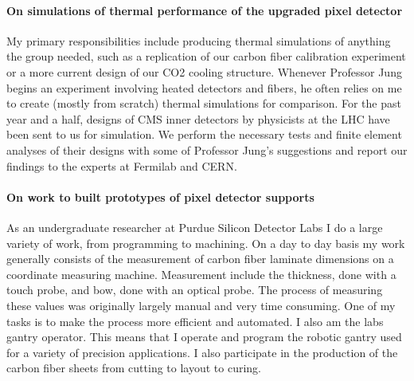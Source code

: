\documentclass[
  paper=a4,
  fontsize=12pt,
  DIV=16,
  headheight=52pt,
  footheight=45pt,
  headinclude,
  parskip=full,
]{scrartcl}
\begin{document}
\paragraph{On simulations of thermal performance of the upgraded pixel detector}
My primary responsibilities include producing thermal simulations of anything the group needed, such as a replication of our carbon fiber calibration experiment or a more current design of our CO2 cooling structure.
Whenever Professor Jung begins an experiment involving heated detectors and fibers, he often relies on me to create (mostly from scratch) thermal simulations for comparison.
For the past year and a half, designs of CMS inner detectors by physicists at the LHC have been sent to us for simulation.
We perform the necessary tests and finite element analyses of their designs with some of Professor Jung’s suggestions and report our findings to the experts at Fermilab and CERN.

\paragraph{On work to built prototypes of pixel detector supports}
As an undergraduate researcher at Purdue Silicon Detector Labs I do a large variety of work, from programming to machining.
On a day to day basis my work generally consists of the measurement of carbon fiber laminate dimensions on a coordinate measuring machine.
Measurement include the thickness, done with a touch probe, and bow, done with an optical probe.
The process of measuring these values was originally largely manual and very time consuming.
One of my tasks is to make the process more efficient and automated.
I also am the labs gantry operator.
This means that I operate and program the robotic gantry used for a variety of precision applications.
I also participate in the production of the carbon fiber sheets from cutting to layout to curing.
\end{document}
